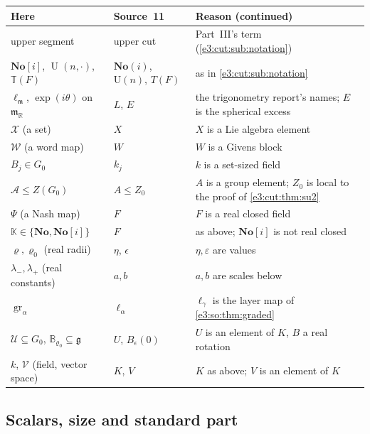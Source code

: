 \documentclass[11pt,letterpaper]{article}
\numberwithin{equation}{section}
\theoremstyle{definition}
\theoremstyle{remark}
\newcommand{\No}{\mathbf{No}}
\newcommand{\R}{\mathbb R}
\newcommand{\TT}{\mathbb T}
\newcommand{\mm}{\mathfrak m}
\newcommand{\eps}{\varepsilon}
\newcommand{\Un}{\operatorname{U}}
\begin{document}
\begin{center}\small
\begin{tabular}{L{0.27\textwidth}L{0.23\textwidth}L{0.4\textwidth}}
\toprule
Here & Source~11 & Reason (continued)\\
\midrule
upper segment & upper cut & Part~III's term (\cref{e3:cut:sub:notation})\\
$\No[i]$, $\Un(n,\cdot)$, $\TT(F)$ & $\No(i)$, $\mathrm U(n)$, $T(F)$ & as in
\cref{e3:cut:sub:notation}\\
$\ell_{\mm}$, $\exp(i\theta)$ on $\mm_{\R}$ & $L$, $E$ & the trigonometry
report's names; $E$ is the spherical excess\\
$\mathcal X$ (a set) & $X$ & $X$ is a Lie algebra element\\
$\mathcal W$ (a word map) & $W$ & $W$ is a Givens block\\
$B_j\in G_0$ & $k_j$ & $k$ is a set-sized field\\
$\mathcal A\le Z(G_0)$ & $A\le Z_0$ & $A$ is a group element; $Z_0$ is local to
the proof of \cref{e3:cut:thm:su2}\\
$\Psi$ (a Nash map) & $F$ & $F$ is a real closed field\\
$\mathbb K\in\{\No,\No[i]\}$ & $F$ & as above; $\No[i]$ is not real closed\\
$\varrho,\varrho_0$ (real radii) & $\eta$, $\epsilon$ & $\eta,\eps$ are
values\\
$\lambda_-,\lambda_+$ (real constants) & $a,b$ & $a,b$ are scales below\\
$\operatorname{gr}_\alpha$ & $\ell_\alpha$ & $\ell_\gamma$ is the layer map of
\cref{e3:so:thm:graded}\\
$\mathcal U\subseteq G_0$, $\mathbb B_{\varrho_0}\subseteq\mathfrak g$ &
$U$, $B_\epsilon(0)$ & $U$ is an element of $K$, $B$ a real rotation\\
$k$, $\mathcal V$ (field, vector space) & $K$, $V$ & $K$ as above; $V$ is an
element of $K$\\
\bottomrule
\end{tabular}
\end{center}

\subsection{Scalars, size and standard part}\label{e3:cpt:sub:scalars}
\end{document}
